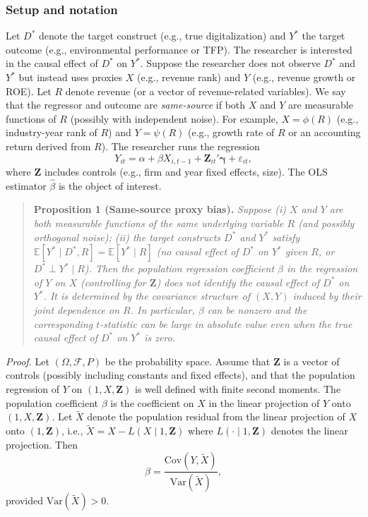 \subsubsection{Setup and notation}

Let $D^*$ denote the target construct (e.g., true digitalization) and $Y^*$ the target outcome (e.g., environmental performance or TFP). The researcher is interested in the causal effect of $D^*$ on $Y^*$. Suppose the researcher does not observe $D^*$ and $Y^*$ but instead uses proxies $X$ (e.g., revenue rank) and $Y$ (e.g., revenue growth or ROE). Let $R$ denote revenue (or a vector of revenue-related variables). We say that the regressor and outcome are \emph{same-source} if both $X$ and $Y$ are measurable functions of $R$ (possibly with independent noise). For example, $X = \phi(R)$ (e.g., industry-year rank of $R$) and $Y = \psi(R)$ (e.g., growth rate of $R$ or an accounting return derived from $R$). The researcher runs the regression
\begin{equation}
Y_{it} = \alpha + \beta X_{i,t-1} + \mathbf{Z}_{it}'\boldsymbol{\gamma} + \varepsilon_{it},
\end{equation}
where $\mathbf{Z}$ includes controls (e.g., firm and year fixed effects, size). The OLS estimator $\hat{\beta}$ is the object of interest.

\begin{quote}
\textbf{Proposition 1 (Same-source proxy bias).} \textit{Suppose (i) $X$ and $Y$ are both measurable functions of the same underlying variable $R$ (and possibly orthogonal noise); (ii) the target constructs $D^*$ and $Y^*$ satisfy $\mathbb{E}[Y^* \mid D^*, R] = \mathbb{E}[Y^* \mid R]$ (no causal effect of $D^*$ on $Y^*$ given $R$, or $D^* \perp Y^* \mid R$). Then the population regression coefficient $\beta$ in the regression of $Y$ on $X$ (controlling for $\mathbf{Z}$) does not identify the causal effect of $D^*$ on $Y^*$. It is determined by the covariance structure of $(X,Y)$ induced by their joint dependence on $R$. In particular, $\beta$ can be nonzero and the corresponding $t$-statistic can be large in absolute value even when the true causal effect of $D^*$ on $Y^*$ is zero.}
\end{quote}

\noindent\textit{Proof.} Let $(\Omega, \mathcal{F}, P)$ be the probability space. Assume that $\mathbf{Z}$ is a vector of controls (possibly including constants and fixed effects), and that the population regression of $Y$ on $(1, X, \mathbf{Z})$ is well defined with finite second moments. The population coefficient $\beta$ is the coefficient on $X$ in the linear projection of $Y$ onto $(1, X, \mathbf{Z})$. Let $\tilde{X}$ denote the population residual from the linear projection of $X$ onto $(1, \mathbf{Z})$, i.e., $\tilde{X} = X - L(X \mid 1, \mathbf{Z})$ where $L(\cdot \mid 1, \mathbf{Z})$ denotes the linear projection. Then
\begin{equation}
\beta = \frac{\mathrm{Cov}(Y, \tilde{X})}{\mathrm{Var}(\tilde{X})},
\end{equation}
provided $\mathrm{Var}(\tilde{X}) > 0$.

